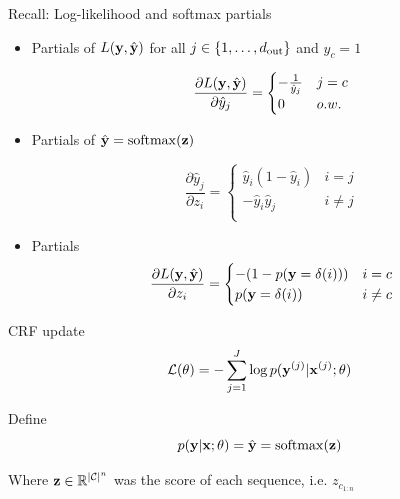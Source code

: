 \documentclass{beamer}
\begin{document}
 \begin{frame}{Recall: Log-likelihood and softmax partials}


     \begin{itemize}
     \item 
     Partials of $L(\mathbf{y}, \hat{\mathbf{y}})$ for all $j \in \{1, \ldots, {d_{\mathrm{out}}}\}$ and $y_c = 1$

     \[ \frac{\partial L(\mathbf{y}, \hat{\mathbf{y}})}{\partial \hat{y}_j} = \begin{cases}-\frac{1} {\hat{y}_j} & j = c\\ 0 & o.w. \end{cases}  \]

     \item 
    Partials of $\hat{\boldy} = \softmax(\boldz)$

  \[ \frac{\partial \hat{y}_j }{\partial z_i} =
    \begin{cases}
      \hat{y}_i (1 - \hat{y}_i) & i = j\\
      - \hat{y}_i \hat{y}_j & i \neq j \\
    \end{cases} \]

  \item Partials
  \[ \frac{\partial L(\mathbf{y}, \hat{\mathbf{y}}) }{\partial z_i} =
    \begin{cases}
     -(1 - p(\mathbf{y} = \delta(i))) & i = c\\
      p(\mathbf{y} = \delta(i))  & i \neq c \\
    \end{cases} \]

  \end{itemize}
 \end{frame}

 \begin{frame}{CRF update}
   \[ \mathcal{L}(\theta) =  - \sum_{ j=1}^J  \log p(\mathbf{y}^{(j)} | \mathbf{x}^{(j)}; \theta) \]
   \air
   
   Define 
   \[ p(\boldy | \boldx; \theta) = \hat{\boldy} = \softmax(\boldz) \]
   \air 

   Where $\mathbf{z} \in \mathbb{R}^{|\mathcal{C}|^n}$ was the score of each sequence, i.e. $z_{c_{1:n}}$
 \end{frame}
\end{document}
